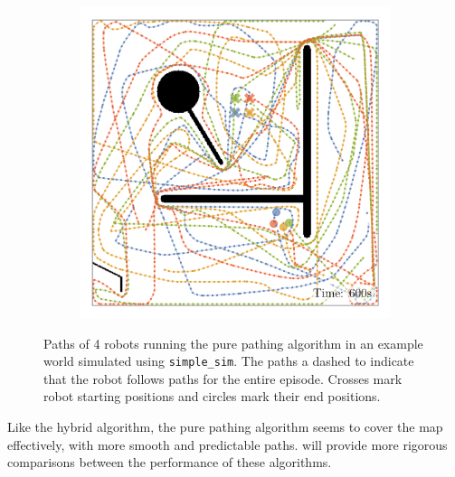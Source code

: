 \begin{figure}[H]
\begin{subfigure}[b]{\w}
    \end{subfigure}
    \begin{subfigure}[b]{\w}
        \centering
        \includegraphics[width=\textwidth]{./figures/plots/paths/search:pathing-paths-(after-600s).png}
    \end{subfigure}
    \caption{Paths of 4 robots running the pure pathing algorithm in an example world simulated using \texttt{simple\_sim}. The paths a dashed to indicate that the robot follows paths for the entire episode. Crosses mark robot starting positions and circles mark their end positions.}
    \label{fig:pure-pathing-paths}
\end{figure}

Like the hybrid algorithm, the pure pathing algorithm seems to cover the map effectively, with more smooth and predictable paths.  will provide more rigorous comparisons between the performance of these algorithms.



